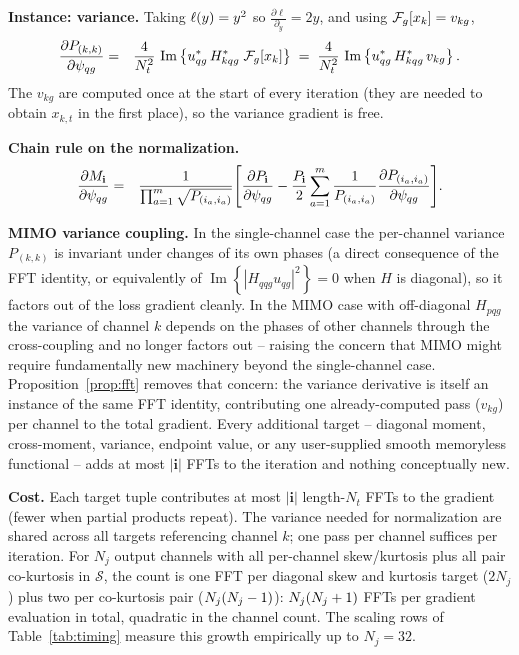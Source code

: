 \documentclass[10pt,a4paper]{article}
\numberwithin{equation}{section}
\DeclarePairedDelimiter\block{[}{]}
\DeclarePairedDelimiter\mat{(}{)}
\DeclareMathOperator{\Imag}{Im}
\newcommand{\im}[1]{\Imag\left\{#1\right\}}
\begin{document}
\textbf{Instance: variance.} Taking $\ell\mat{y} = y^2$ so $\frac{\partial \ell}{\partial_y} = 2 y$, 
and using $\mathcal{F}_g\block*{x_{k}} = v_{k g}$,
\begin{eqnarray}
\frac{\partial P_{(k,k)}}{\partial \psi_{q g}}
	&=& \frac{4}{N_t^2}\,\im{u_{q g}^*\, 
			H_{k q g}^*\;\mathcal{F}_g\block*{x_{k}}}
	\;=\; \frac{4}{N_t^2}\,\im{u_{q g}^*\, H_{k q g}^*\, v_{k g}}.
\end{eqnarray}
The $v_{k g}$ are computed once at the start of every iteration (they are needed to obtain $x_{k,t}$ in the first place), so the variance gradient is free.

\textbf{Chain rule on the normalization.}
\begin{eqnarray}
	\frac{\partial M_\mathbf{i}}{\partial \psi_{q g}}
	&=& \frac{1}{\prod_{a=1}^{m}\sqrt{P_{(i_a,i_a)}}}
		\block*{
			\frac{\partial P_\mathbf{i}}{\partial \psi_{q g}}
		  - \frac{P_\mathbf{i}}{2}
		  		\sum_{a=1}^{m} 
		  			\frac{1}{P_{(i_a,i_a)}}
		  			\frac{\partial P_{(i_a,i_a)}}{\partial \psi_{q g}}}.
\end{eqnarray}

\textbf{MIMO variance coupling.} In the single-channel case the per-channel variance $P_{(k,k)}$ is invariant under changes of its own phases (a direct consequence of the FFT identity, or equivalently of $\im{|H_{q q g}u_{q g}|^2}=0$ when $H$ is diagonal), so it factors out of the loss gradient cleanly. 
In the MIMO case with off-diagonal $H_{p q g}$ the variance of channel $k$ depends on the phases of other channels through the cross-coupling and no longer factors out -- raising the concern that MIMO might require fundamentally new machinery beyond the single-channel case. 
Proposition~\ref{prop:fft} removes that concern: the variance derivative is itself an instance of the same FFT identity, contributing one already-computed pass ($v_{k g}$) per channel to the total gradient. Every additional target -- diagonal moment, cross-moment, variance, endpoint value, or any user-supplied smooth memoryless functional -- adds at most $|\mathbf{i}|$ FFTs to the iteration and nothing conceptually new.

\textbf{Cost.} Each target tuple contributes at most $|\mathbf{i}|$ length-$N_t$ FFTs to the gradient (fewer when partial products repeat). The variance needed for normalization are shared across all targets referencing channel $k$; one pass per channel suffices per iteration. 
For $N_j$ output channels with all per-channel skew/kurtosis plus all pair co-kurtosis in $\mathcal{S}$, the count is one FFT per diagonal skew and kurtosis target ($2 N_j$) plus two per co-kurtosis pair ($N_j\mat{N_j-1}$): $N_j\mat{N_j+1}$ FFTs per gradient evaluation in total, quadratic in the channel count. The scaling rows of Table~\ref{tab:timing} measure this growth empirically up to $N_j = 32$.
\end{document}
